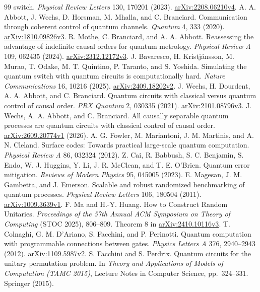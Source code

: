 \documentclass[11pt,letterpaper]{article}
\theoremstyle{definition}\newtheorem{definition}[theorem]{Definition}
\begin{document}
\begin{thebibliography}{99}
switch. \emph{Physical Review Letters} 130, 170201 (2023).
\href{https://arxiv.org/abs/2208.06210v4}{arXiv:2208.06210v4}.
 A. A. Abbott, J. Wechs, D. Horsman, M. Mhalla, and C. Branciard.
Communication through coherent control of quantum channels. \emph{Quantum} 4, 333 (2020).
\href{https://arxiv.org/abs/1810.09826v3}{arXiv:1810.09826v3}.
 R. Mothe, C. Branciard, and A. A. Abbott.
Reassessing the advantage of indefinite causal orders for quantum metrology. \emph{Physical Review A} 109, 062435 (2024).
\href{https://arxiv.org/abs/2312.12172v3}{arXiv:2312.12172v3}.
 J. Bavaresco, H. Kristj\'ansson, M. Murao, T. Odake,
M. T. Quintino, P. Taranto, and S. Yoshida.
Simulating the quantum switch with quantum circuits is computationally hard.
\emph{Nature Communications} 16, 10216 (2025).
\href{https://arxiv.org/abs/2409.18202v2}{arXiv:2409.18202v2}.
 J. Wechs, H. Dourdent, A. A. Abbott, and C. Branciard.
Quantum circuits with classical versus quantum control of causal order.
\emph{PRX Quantum} 2, 030335 (2021).
\href{https://arxiv.org/abs/2101.08796v3}{arXiv:2101.08796v3}.
 J. Wechs, A. A. Abbott, and C. Branciard.
All causally separable quantum processes are quantum circuits with classical control of causal order.
\href{https://arxiv.org/abs/2609.20774v1}{arXiv:2609.20774v1} (2026).
 A. G. Fowler, M. Mariantoni, J. M. Martinis, and A. N. Cleland.
Surface codes: Towards practical large-scale quantum computation.
\emph{Physical Review A} 86, 032324 (2012).
 Z. Cai, R. Babbush, S. C. Benjamin, S. Endo, W. J. Huggins, Y. Li, J. R. McClean, and T. E. O'Brien.
Quantum error mitigation.
\emph{Reviews of Modern Physics} 95, 045005 (2023).
 E. Magesan, J. M. Gambetta, and J. Emerson.
Scalable and robust randomized benchmarking of quantum processes. \emph{Physical Review Letters} 106, 180504 (2011).
\href{https://arxiv.org/abs/1009.3639v1}{arXiv:1009.3639v1}.
 F. Ma and H.-Y. Huang. How to Construct Random Unitaries.
\emph{Proceedings of the 57th Annual ACM Symposium on Theory of Computing}
(STOC 2025), 806--809. Theorem 8 in
\href{https://arxiv.org/abs/2410.10116v3}{arXiv:2410.10116v3}.
 T. Colnaghi, G. M. D'Ariano, S. Facchini, and P. Perinotti.
Quantum computation with programmable connections between gates. \emph{Physics Letters A} 376, 2940--2943 (2012).
\href{https://arxiv.org/abs/1109.5987v2}{arXiv:1109.5987v2}.
 S. Facchini and S. Perdrix.
Quantum circuits for the unitary permutation problem. In \emph{Theory and Applications of Models of Computation (TAMC 2015)}, Lecture Notes in Computer Science, pp.~324--331. Springer (2015).

\end{thebibliography}
\end{document}
